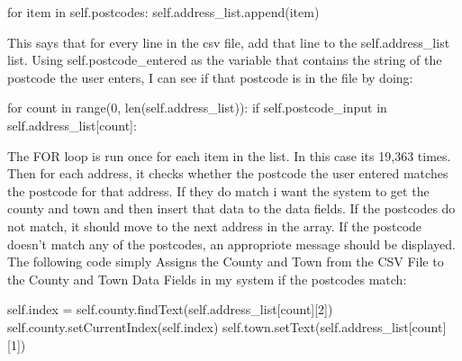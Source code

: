 \begin{python}
 for item in self.postcodes:
                                self.address_list.append(item)
\end{python}

This says that for every line in the csv file, add that line to the self.address_list list. Using self.postcode_entered as the variable that contains the string of the postcode the user enters, I can see if that postcode is in the file by doing:
\begin{python}
for count in range(0, len(self.address_list)):
                                if self.postcode_input in self.address_list[count]:
\end{python}

The FOR loop is run once for each item in the list. In this case its 19,363 times. Then for each address, it checks whether the postcode the user entered matches the postcode for that address. If they do match i want the system to get the county and town and then insert that data to the data fields. If the postcodes do not match, it should move to the next address in the array. If the postcode doesn't match any of the postcodes, an appropriote message should be displayed. The following code simply Assigns the County and Town from the CSV File to the County and Town Data Fields in my system if the postcodes match:

\begin{python}
self.index = self.county.findText(self.address_list[count][2])
                                        self.county.setCurrentIndex(self.index)
                                        self.town.setText(self.address_list[count][1])
\end{python}

